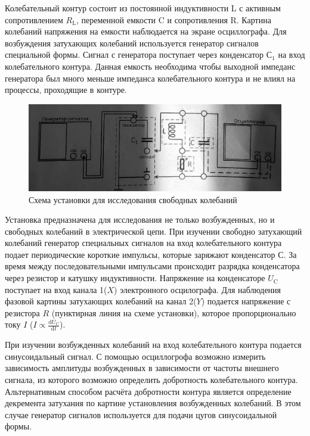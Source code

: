 \documentclass[a4paper,12pt]{article}
\begin{document}
 Колебательный контур состоит из постоянной индуктивности {L} с активным сопротивлением $R_{\text{L}}$, переменной емкости {C} и сопротивления {R}. Картина колебаний напряжения на емкости наблюдается на экране осциллографа. Для возбуждения затухающих колебаний используется генератор сигналов специальной формы. Сигнал с генератора поступает через конденсатор $С_{\text{1}}$ на вход колебательного контура. Данная емкость необходима чтобы выходной импеданс генератора был много меньше импеданса колебательного контура и не влиял на процессы, проходящие в контуре. 

 \begin{figure}[h]
	\centering
	\includegraphics[scale=0.5]{ystanovka.png}
	\caption{Схема установки для исследования свободных колебаний} \label{Device}
\end{figure}


 Установка предназначена для исследования не только возбужденных, но и свободных колебаний в электрической цепи. При изучении свободно затухающий колебаний генератор специальных сигналов на вход колебательного контура подает периодические короткие импульсы, которые заряжают конденсатор $С$. За время между последовательными импульсами происходит разрядка конденсатора через резистор и катушку индуктивности. Напряжение на конденсаторе $U_{\text{C}}$ поступает на вход канала 1($X$) электронного осцилографа. Для наблюдения фазовой картины затухающих колебаний на канал 2($Y$) подается напряжение с резистора $R$ (пунктирная линия на схеме установки), которое пропорционально току $I$ ($I\propto\frac{\text{d}U_C}{\text{d}t}$).

 При изучении возбужденных колебаний на вход колебательного контура подается синусоидальный сигнал. С помощью осциллогрофа возможно измерить зависимость амплитуды возбужденных в зависимости от частоты внешнего сигнала, из которого возможно определить добротность колебательного контура. Альтернативным способом расчёта добротности контура является определение декремента затухания по картине установления возбужденных колебаний. В этом случае генератор сигналов используется для подачи цугов синусоидальной формы. 
  
\end{document}
